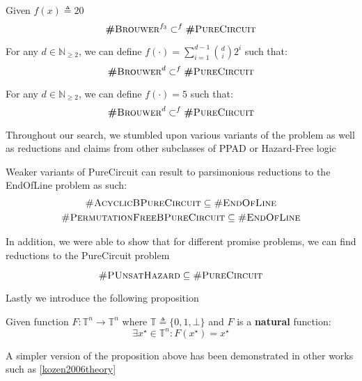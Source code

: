\begin{theorem}
    Given $f(x) \triangleq 20$
    $$
    \textbf{\#}\textsc{Brouwer}^{f_3} \subset^f \textbf{\#}\textsc{PureCircuit}
    $$
\end{theorem}

\begin{corollary}
    For any $d \in \mathbb{N}_{\geq 2}$, we can define $f(\cdot) = \sum_{i = 1}^{d -1}  \binom{d}{i} 2^i$
    such that:
    $$
    \textbf{\#}\textsc{Brouwer}^{d} \subset^f \textbf{\#}\textsc{PureCircuit}
    $$ 
\end{corollary}



\begin{conjecture}
    For any $d \in \mathbb{N}_{\geq 2}$, we can define $f(\cdot) = 5$
    such that:
    $$
    \textbf{\#}\textsc{Brouwer}^{d} \subset^f \textbf{\#}\textsc{PureCircuit}
    $$ 
\end{conjecture}

Throughout our search, we stumbled upon
various variants of the problem as well as reductions and claims from other
subclasses of PPAD or Hazard-Free logic

\begin{proposition}
    Weaker variants of PureCircuit can result to parsimonious reductions to the EndOfLine problem
    as such:
    \begin{gather*}
        \textsc{\#AcyclicBPureCircuit} \subseteq \textsc{\#EndOfLine} \\
        \textsc{\#PermutationFreeBPureCircuit} \subseteq \textsc{\#EndOfLine}
    \end{gather*}
\end{proposition}


In addition, we were able to show that for different promise problems,
we can find reductions to the PureCircuit problem

\begin{proposition}
    $$
        \textsc{\#PUnsatHazard} \subseteq  \textsc{\#PureCircuit}
    $$
\end{proposition}

Lastly we introduce the following proposition
\begin{proposition}
    Given function $F: \mathbb{T}^n \to \mathbb{T}^n$
    where $\mathbb{T} \triangleq \{0, 1, \bot\}$ and $F$ is a \textbf{natural}
    function:
$$
\exists x^\star \in \mathbb{T}^n: F(x^\star) = x^\star
$$
\end{proposition}
A simpler version of the proposition above has been demonstrated
in other works such as \ref{kozen2006theory}
